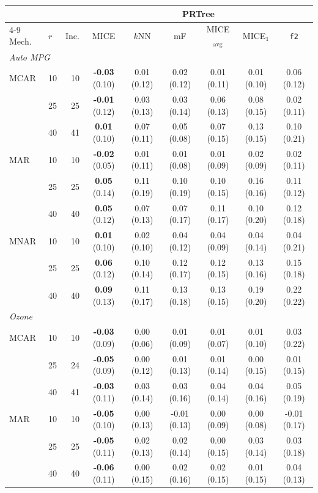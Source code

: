 \begin{tabular}{llrcccccc}
\toprule
 & & & \multicolumn{6}{c}{PRTree}\\
\cmidrule(lr){4-9}
Mech. & $r$ & Inc. & MICE & $k$NN & mF & MICE$_{\mathrm{avg}}$ & MICE$_1$ & \texttt{f2}\\
\midrule
\multicolumn{9}{l}{\textit{Auto MPG}}\\
MCAR & 10 & 10 & \textbf{-0.03} (0.10) & 0.01 (0.12) & 0.02 (0.12) & 0.01 (0.11) & 0.01 (0.10) & 0.06 (0.12)\\
 & 25 & 25 & \textbf{-0.01} (0.12) & 0.03 (0.13) & 0.03 (0.14) & 0.06 (0.13) & 0.08 (0.15) & 0.02 (0.11)\\
 & 40 & 41 & \textbf{0.01} (0.10) & 0.07 (0.11) & 0.05 (0.08) & 0.07 (0.15) & 0.13 (0.15) & 0.10 (0.21)\\
MAR & 10 & 10 & \textbf{-0.02} (0.05) & 0.01 (0.11) & 0.01 (0.08) & 0.01 (0.09) & 0.02 (0.09) & 0.02 (0.11)\\
 & 25 & 25 & \textbf{0.05} (0.14) & 0.11 (0.19) & 0.10 (0.19) & 0.10 (0.15) & 0.16 (0.16) & 0.11 (0.12)\\
 & 40 & 40 & \textbf{0.05} (0.12) & 0.07 (0.13) & 0.07 (0.17) & 0.11 (0.17) & 0.10 (0.20) & 0.12 (0.18)\\
MNAR & 10 & 10 & \textbf{0.01} (0.10) & 0.02 (0.10) & 0.04 (0.12) & 0.04 (0.09) & 0.04 (0.14) & 0.04 (0.21)\\
 & 25 & 25 & \textbf{0.06} (0.12) & 0.10 (0.14) & 0.12 (0.17) & 0.12 (0.15) & 0.13 (0.16) & 0.15 (0.18)\\
 & 40 & 40 & \textbf{0.09} (0.13) & 0.11 (0.17) & 0.13 (0.18) & 0.13 (0.15) & 0.19 (0.20) & 0.22 (0.22)\\
\midrule
\multicolumn{9}{l}{\textit{Ozone}}\\
MCAR & 10 & 10 & \textbf{-0.03} (0.09) & 0.00 (0.06) & 0.01 (0.09) & 0.01 (0.07) & 0.01 (0.10) & 0.03 (0.22)\\
 & 25 & 24 & \textbf{-0.05} (0.09) & 0.00 (0.12) & 0.01 (0.13) & 0.01 (0.14) & 0.00 (0.15) & 0.01 (0.15)\\
 & 40 & 41 & \textbf{-0.03} (0.11) & 0.03 (0.14) & 0.03 (0.16) & 0.04 (0.14) & 0.04 (0.16) & 0.05 (0.19)\\
MAR & 10 & 10 & \textbf{-0.05} (0.10) & 0.00 (0.13) & -0.01 (0.13) & 0.00 (0.09) & 0.00 (0.08) & -0.01 (0.17)\\
 & 25 & 25 & \textbf{-0.05} (0.11) & 0.02 (0.13) & 0.02 (0.14) & 0.00 (0.15) & 0.03 (0.14) & 0.03 (0.18)\\
 & 40 & 40 & \textbf{-0.06} (0.11) & 0.00 (0.15) & 0.02 (0.16) & 0.02 (0.15) & 0.01 (0.15) & 0.04 (0.13)\\

\end{tabular}
